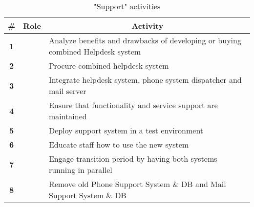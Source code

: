 \begin{table}[H]
	\centering
	\begin{tabular}{|c|p{3cm}|p{10.5cm}|}
		\hline
		\textbf{\#} & \multicolumn{1}{c|}{\textbf{Role}} & \multicolumn{1}{c|}{\textbf{Activity}} \\ \hline
		\textbf{1} &  & Analyze benefits and drawbacks of developing or buying combined Helpdesk system \\ \hline
		\textbf{2} &  & Procure combined helpdesk system\\ \hline
		\textbf{3} &  & Integrate helpdesk system, phone system dispatcher and mail server \\ \hline
		\textbf{4} &  & Ensure that functionality and service support are maintained \\ \hline
		\textbf{5} &  & Deploy support system in a test environment\\ \hline
		\textbf{6} &  & Educate staff how to use the new system\\ \hline
		\textbf{7} &  & Engage transition period by having both systems running in parallel\\ \hline
		\textbf{8} &  & Remove old Phone Support System \& DB and Mail Support System \& DB\\ \hline
	\end{tabular}	
	\caption{"Support" activities}
	\label{table:activities_support}
\end{table}
